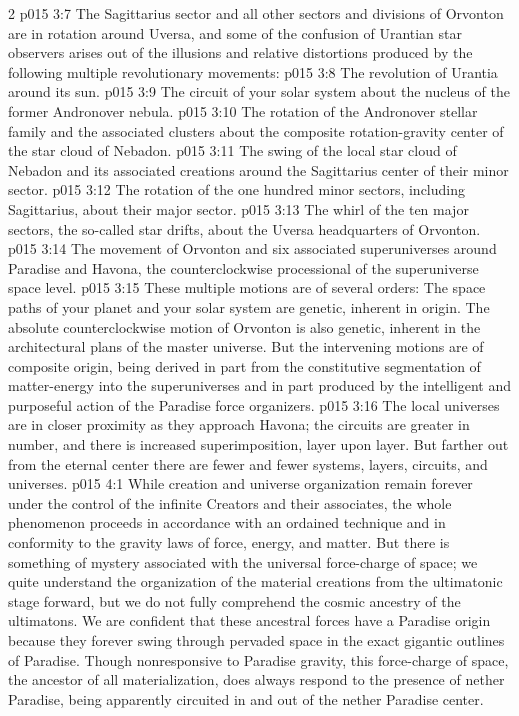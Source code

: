 \begin{multicols}{2}
\pc \vs p015 3:7 The Sagittarius sector and all other sectors and divisions of Orvonton are in rotation around Uversa, and some of the confusion of Urantian star observers arises out of the illusions and relative distortions produced by the following multiple revolutionary movements:
\pc \vs p015 3:8 \bibnobreakspace The revolution of Urantia around its sun.
\vs p015 3:9 \bibnobreakspace The circuit of your solar system about the nucleus of the former Andronover nebula.
\vs p015 3:10 \bibnobreakspace The rotation of the Andronover stellar family and the associated clusters about the composite rotation\hyp{}gravity center of the star cloud of Nebadon.
\vs p015 3:11 \bibnobreakspace The swing of the local star cloud of Nebadon and its associated creations around the Sagittarius center of their minor sector.
\vs p015 3:12 \bibnobreakspace The rotation of the one hundred minor sectors, including Sagittarius, about their major sector.
\vs p015 3:13 \bibnobreakspace The whirl of the ten major sectors, the so\hyp{}called star drifts, about the Uversa headquarters of Orvonton.
\vs p015 3:14 \bibnobreakspace The movement of Orvonton and six associated superuniverses around Paradise and Havona, the counterclockwise processional of the superuniverse space level.
\pc \vs p015 3:15 These multiple motions are of several orders: The space paths of your planet and your solar system are genetic, inherent in origin. The absolute counterclockwise motion of Orvonton is also genetic, inherent in the architectural plans of the master universe. But the intervening motions are of composite origin, being derived in part from the constitutive segmentation of matter\hyp{}energy into the superuniverses and in part produced by the intelligent and purposeful action of the Paradise force organizers.
\pc \vs p015 3:16 The local universes are in closer proximity as they approach Havona; the circuits are greater in number, and there is increased superimposition, layer upon layer. But farther out from the eternal center there are fewer and fewer systems, layers, circuits, and universes.
\vs p015 4:1 While creation and universe organization remain forever under the control of the infinite Creators and their associates, the whole phenomenon proceeds in accordance with an ordained technique and in conformity to the gravity laws of force, energy, and matter. But there is something of mystery associated with the universal force\hyp{}charge of space; we quite understand the organization of the material creations from the ultimatonic stage forward, but we do not fully comprehend the cosmic ancestry of the ultimatons. We are confident that these ancestral forces have a Paradise origin because they forever swing through pervaded space in the exact gigantic outlines of Paradise. Though nonresponsive to Paradise gravity, this force\hyp{}charge of space, the ancestor of all materialization, does always respond to the presence of nether Paradise, being apparently circuited in and out of the nether Paradise center.

\end{multicols}
